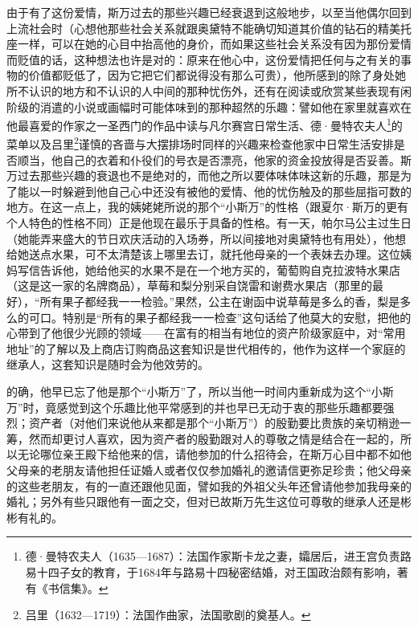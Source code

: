 \par 由于有了这份爱情，斯万过去的那些兴趣已经衰退到这般地步，以至当他偶尔回到上流社会时（心想他那些社会关系就跟奥黛特不能确切知道其价值的钻石的精美托座一样，可以在她的心目中抬高他的身价，而如果这些社会关系没有因为那份爱情而贬值的话，这种想法也许是对的：原来在他心中，这份爱情把任何与之有关的事物的价值都贬低了，因为它把它们都说得没有那么可贵），他所感到的除了身处她所不认识的地方和不认识的人中间的那种忧伤外，还有在阅读或欣赏某些表现有闲阶级的消遣的小说或画幅时可能体味到的那种超然的乐趣：譬如他在家里就喜欢在他最喜爱的作家之一圣西门的作品中读与凡尔赛宫日常生活、德·曼特农夫人\footnote{德·曼特农夫人（1635—1687）：法国作家斯卡龙之妻，孀居后，进王宫负责路易十四子女的教育，于1684年与路易十四秘密结婚，对王国政治颇有影响，著有《书信集》。}的菜单以及吕里\footnote{吕里（1632—1719）：法国作曲家，法国歌剧的奠基人。}谨慎的吝啬与大摆排场时同样的兴趣来检查他家中日常生活安排是否顺当，他自己的衣着和仆役们的号衣是否漂亮，他家的资金投放得是否妥善。斯万过去那些兴趣的衰退也不是绝对的，而他之所以要体味体味这新的乐趣，那是为了能以一时躲避到他自己心中还没有被他的爱情、他的忧伤触及的那些屈指可数的地方。在这一点上，我的姨姥姥所说的那个“小斯万”的性格（跟夏尔·斯万的更有个人特色的性格不同）正是他现在最乐于具备的性格。有一天，帕尔马公主过生日（她能弄来盛大的节日欢庆活动的入场券，所以间接地对奥黛特也有用处），他想给她送点水果，可不太清楚该上哪里去订，就托他母亲的一个表妹去办理。这位姨妈写信告诉他，她给他买的水果不是在一个地方买的，葡萄购自克拉波特水果店（这是这一家的名牌商品），草莓和梨分别采自饶雷和谢费水果店（那里的最好），“所有果子都经我一一检验。”果然，公主在谢函中说草莓是多么的香，梨是多么的可口。特别是“所有的果子都经我一一检查”这句话给了他莫大的安慰，把他的心带到了他很少光顾的领域——在富有的相当有地位的资产阶级家庭中，对“常用地址”的了解以及上商店订购商品这套知识是世代相传的，他作为这样一个家庭的继承人，这套知识是随时会为他效劳的。
\par 的确，他早已忘了他是那个“小斯万”了，所以当他一时间内重新成为这个“小斯万”时，竟感觉到这个乐趣比他平常感到的并也早已无动于衷的那些乐趣都要强烈；资产者（对他们来说他从来都是那个“小斯万”）的殷勤要比贵族的亲切稍逊一筹，然而却更讨人喜欢，因为资产者的殷勤跟对人的尊敬之情是结合在一起的，所以无论哪位亲王殿下给他来的信，请他参加的什么招待会，在斯万心目中都不如他父母亲的老朋友请他担任证婚人或者仅仅参加婚礼的邀请信更弥足珍贵；他父母亲的这些老朋友，有的一直还跟他见面，譬如我的外祖父头年还曾请他参加我母亲的婚礼；另外有些只跟他有一面之交，但对已故斯万先生这位可尊敬的继承人还是彬彬有礼的。
